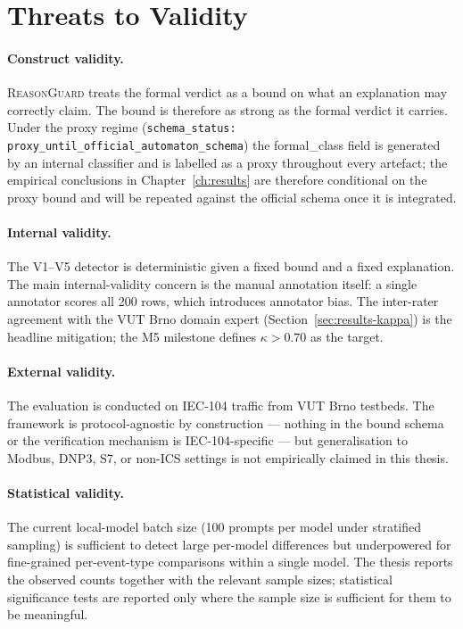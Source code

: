 \section{Threats to Validity}
\label{sec:discussion-threats}

\paragraph{Construct validity.}
\textsc{ReasonGuard} treats the formal verdict as a bound on what an
explanation may correctly claim. The bound is therefore as strong as the
formal verdict it carries. Under the proxy regime
(\texttt{schema\_status: proxy\_until\_official\_automaton\_schema}) the
formal\_class field is generated by an internal classifier and is labelled
as a proxy throughout every artefact; the empirical conclusions in
Chapter~\ref{ch:results} are therefore conditional on the proxy bound and
will be repeated against the official schema once it is integrated.

\paragraph{Internal validity.}
The V1--V5 detector is deterministic given a fixed bound and a fixed
explanation. The main internal-validity concern is the manual annotation
itself: a single annotator scores all 200 rows, which introduces annotator
bias. The inter-rater agreement with the VUT Brno domain expert
(Section~\ref{sec:results-kappa}) is the headline mitigation; the M5
milestone defines $\kappa > 0.70$ as the target.

\paragraph{External validity.}
The evaluation is conducted on IEC-104 traffic from VUT Brno testbeds. The
framework is protocol-agnostic by construction --- nothing in the bound
schema or the verification mechanism is IEC-104-specific --- but
generalisation to Modbus, DNP3, S7, or non-ICS settings is not
empirically claimed in this thesis.

\paragraph{Statistical validity.}
The current local-model batch size (100 prompts per model under stratified
sampling) is sufficient to detect large per-model differences but
underpowered for fine-grained per-event-type comparisons within a single
model. The thesis reports the observed counts together with the relevant
sample sizes; statistical significance tests are reported only where the
sample size is sufficient for them to be meaningful.

